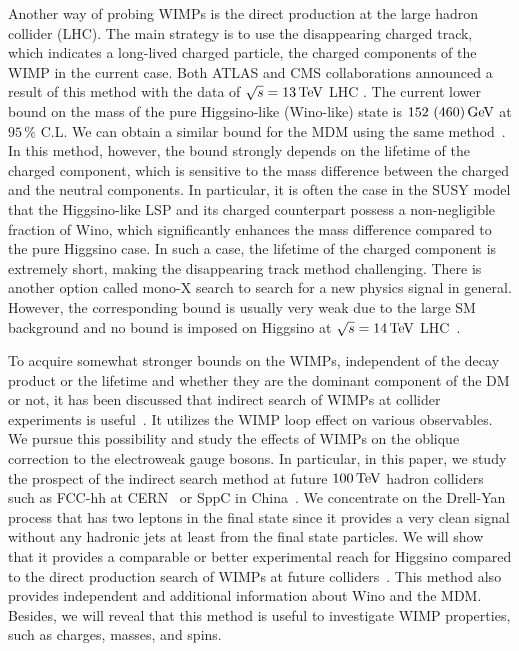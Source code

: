 \documentclass[12pt,twoside,book]{article}
\begin{document}
Another way of probing WIMPs is the direct production at the large hadron collider (LHC).
The main strategy is to use the disappearing charged track, which indicates a long-lived charged particle, the charged components of the WIMP in the current case.
Both ATLAS and CMS collaborations announced a result of this method with the data of $\sqrt{s} = 13\,{\rm TeV}$ LHC \cite{Aaboud:2017mpt, ATL-PHYS-PUB-2017-019, Sirunyan:2018ldc}.
The current lower bound on the mass of the pure Higgsino-like (Wino-like) state is $152~(460)\,{\rm GeV}$ at $95\,\%$ C.L.
We can obtain a similar bound for the MDM using the same method~\cite{Ostdiek:2015aga}.
In this method, however, the bound strongly depends on the lifetime of the charged component, which is sensitive to the mass difference between the charged and the neutral components.
In particular, it is often the case in the SUSY model that the Higgsino-like LSP and its charged counterpart possess a non-negligible fraction of Wino, which significantly enhances the mass difference compared to the pure Higgsino case.
In such a case, the lifetime of the charged component is extremely short, making the disappearing track method challenging.
There is another option called mono-X search to search for a new physics signal in general.
However, the corresponding bound is usually very weak due to the large SM background and no bound is imposed on Higgsino at $\sqrt{s} = 14\,{\rm TeV}$ LHC~\cite{Baer:2014cua}.

To acquire somewhat stronger bounds on the WIMPs, independent of the decay product or the lifetime and whether they are the dominant component of the DM or not, it has been discussed that indirect search of WIMPs at collider experiments is useful~\cite{Alves:2014cda, Gross:2016ioi, Farina:2016rws, Harigaya:2015yaa, Matsumoto:2017vfu}.
It utilizes the WIMP loop effect on various observables.  We pursue this possibility and study the effects of WIMPs on the oblique correction to the electroweak gauge bosons.  In particular, in this paper, we study the prospect of the indirect search method at future $100\,{\rm TeV}$ hadron colliders such as FCC-hh at CERN~\cite{Mangano:2016jyj, Contino:2016spe, Golling:2016gvc} or SppC in China~\cite{CEPC-SPPCStudyGroup:2015csa, CEPC-SPPCStudyGroup:2015esa}.
We concentrate on the Drell-Yan process that has two leptons in the final state since it provides a very clean signal without any hadronic jets at least from the final state particles.
We will show that it provides a comparable or better experimental reach for Higgsino compared to the direct production search of WIMPs at future colliders~\cite{Low:2014cba, Cirelli:2014dsa, Han:2018wus, Mahbubani:2017gjh}.
This method also provides independent and additional information about Wino and the MDM.
Besides, we will reveal that this method is useful to investigate WIMP properties, such as charges, masses, and spins.
\end{document}
